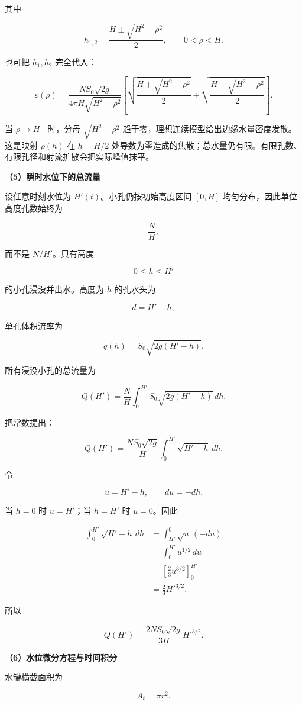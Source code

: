 \documentclass[12pt,a4paper,UTF8]{ctexart}
\begin{document}
其中

\[\boxed{
h_{1,2}
=\frac{H\pm\sqrt{H^2-\rho^2}}{2}
},\qquad 0<\rho<H.\]

也可把 \(h_1,h_2\) 完全代入：

\[\boxed{
\varepsilon(\rho)
=
\frac{NS_0\sqrt{2g}}
{4\pi H\sqrt{H^2-\rho^2}}
\left[
\sqrt{\frac{H+\sqrt{H^2-\rho^2}}{2}}
+\sqrt{\frac{H-\sqrt{H^2-\rho^2}}{2}}
\right]
}.\]

当 \(\rho\to H^-\) 时，分母 \(\sqrt{H^2-\rho^2}\)
趋于零，理想连续模型给出边缘水量密度发散。这是映射 \(\rho(h)\) 在
\(h=H/2\)
处导数为零造成的焦散；总水量仍有限。有限孔数、有限孔径和射流扩散会把实际峰值抹平。

\textbf{（5）瞬时水位下的总流量}

设任意时刻水位为 \(H'(t)\)。小孔仍按初始高度区间 \([0,H]\)
均匀分布，因此单位高度孔数始终为

\[\frac NH,\]

而不是 \(N/H'\)。只有高度

\[0\leq h\leq H'\]

的小孔浸没并出水。高度为 \(h\) 的孔水头为

\[d=H'-h,\]

单孔体积流率为

\[q(h)=S_0\sqrt{2g(H'-h)}.\]

所有浸没小孔的总流量为

\[Q(H')
=\frac NH
\int_0^{H'}
S_0\sqrt{2g(H'-h)}\,dh.\]

把常数提出：

\[Q(H')
=\frac{NS_0\sqrt{2g}}{H}
\int_0^{H'}\sqrt{H'-h}\,dh.\]

令

\[u=H'-h,\qquad du=-dh.\]

当 \(h=0\) 时 \(u=H'\)；当 \(h=H'\) 时 \(u=0\)。因此

\[\begin{aligned}
\int_0^{H'}\sqrt{H'-h}\,dh
&=\int_{H'}^0\sqrt u\,(-du)\\
&=\int_0^{H'}u^{1/2}\,du\\
&=\left[\frac23u^{3/2}\right]_0^{H'}\\
&=\frac23H'^{3/2}.
\end{aligned}\]

所以

\[\boxed{
Q(H')
=\frac{2NS_0\sqrt{2g}}{3H}
H'^{3/2}
}.\]

\textbf{（6）水位微分方程与时间积分}

水罐横截面积为

\[A_t=\pi r^2.\]
\end{document}
